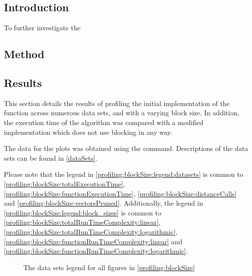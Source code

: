 \subsection{Introduction}
\label{profiling:blockSize:introduction}
To further investigate the

\subsection{Method}
\label{profiling:blockSize:method}

\subsection{Results}
\label{profiling:blockSize:results}
This section details the results of profiling the initial 
implementation of the  function across
numerous data sets, and with a varying block size. In addition, the execution
time of the algorithm was compared with a modified implementation which does not
use blocking in any way.

The data for the plots was obtained using the 
 command. Descriptions of the data sets can be found in
\autoref{dataSets}.


Please note that the legend in \autoref{profiling:blockSize:legend:datasets} is
common to \autoref{profiling:blockSize:totalExecutionTime},
\autoref{profiling:blockSize:functionExecutionTime},
\autoref{profiling:blockSize:distanceCalls} and
\autoref{profiling:blockSize:vectorsPruned}. Additionally, the legend in
\autoref{profiling:blockSize:legend:block_sizes} is common to
\autoref{profiling:blockSize:totalRunTimeComplexity:linear},
\autoref{profiling:blockSize:totalRunTimeComplexity:logarithmic},
\autoref{profiling:blockSize:functionRunTimeComplexity:linear} and
\autoref{profiling:blockSize:functionRunTimeComplexity:logarithmic}.

\begin{figure}
    \centering
    
    \caption[Block size profiling legend]{The data sets legend for all figures
        in \autoref{profiling:blockSize}}
    \label{profiling:blockSize:legend:datasets}
\end{figure}

